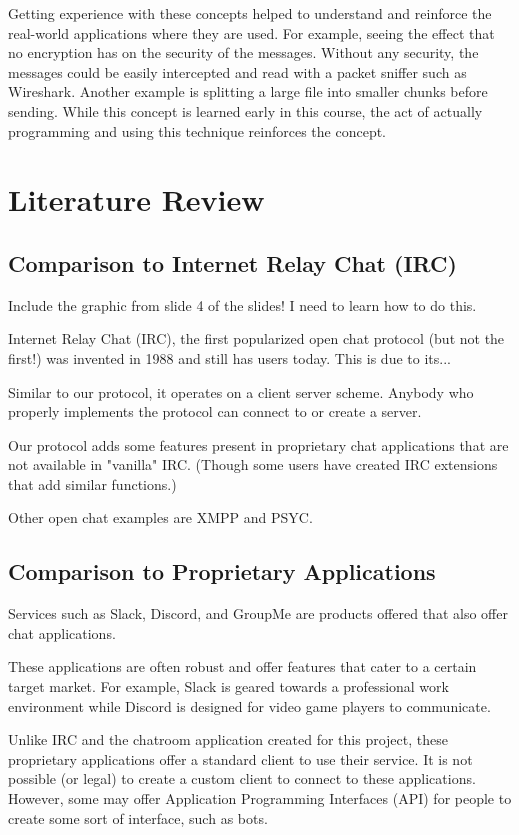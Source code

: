 \documentclass{article}
\begin{document}
Getting experience with these concepts helped to understand and reinforce the real-world applications where they are used. For example, seeing the effect that no encryption has on the security of the messages. Without any security, the messages could be easily intercepted and read with a packet sniffer such as Wireshark. Another example is splitting a large file into smaller chunks before sending. While this concept is learned early in this course, the act of actually programming and using this technique reinforces the concept.

\section{Literature Review}

\subsection{Comparison to Internet Relay Chat (IRC)}

Include the graphic from slide 4 of the slides! I need to learn how to do this. 

Internet Relay Chat (IRC), the first popularized open chat protocol (but not the first!) was invented in 1988 and still has users today. This is due to its...

Similar to our protocol, it operates on a client server scheme. Anybody who properly implements the protocol can connect to or create a server. 

Our protocol adds some features present in proprietary chat applications that are not available in "vanilla" IRC. (Though some users have created IRC extensions that add similar functions.)

Other open chat examples are XMPP and PSYC. 

\subsection{Comparison to Proprietary Applications}

Services such as Slack, Discord, and GroupMe are products offered that also offer chat applications. 

These applications are often robust and offer features that cater to a certain target market. For example, Slack is geared towards a professional work environment while Discord is designed for video game players to communicate. 

Unlike IRC and the chatroom application created for this project, these proprietary applications offer a standard client to use their service. It is not possible (or legal) to create a custom client to connect to these applications. However, some may offer Application Programming Interfaces (API) for people to create some sort of interface, such as bots. 
\end{document}
